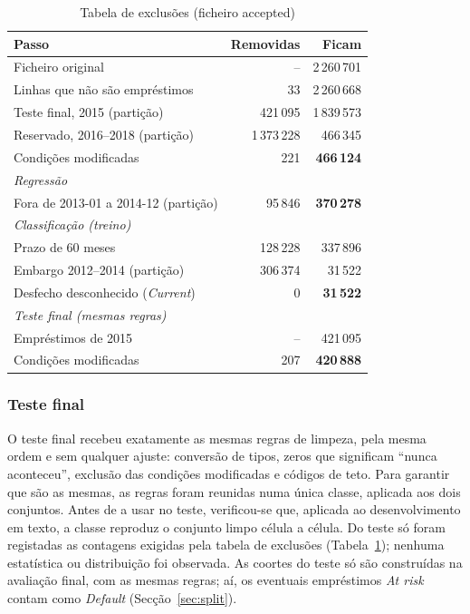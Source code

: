 \begin{table}[!t]
\caption{Tabela de exclusões (ficheiro accepted)}
\label{tab:exclusoes}
\centering
\footnotesize
\begin{tabular}{|p{}|r|r|}
\hline
\textbf{Passo} & \textbf{Removidas} & \textbf{Ficam} \\
\hline
Ficheiro original & -- & 2\,260\,701 \\
\hline
Linhas que não são empréstimos & 33 & 2\,260\,668 \\
\hline
Teste final, 2015 (partição) & 421\,095 & 1\,839\,573 \\
\hline
Reservado, 2016--2018 (partição) & 1\,373\,228 & 466\,345 \\
\hline
Condições modificadas & 221 & \textbf{466\,124} \\
\hline
\multicolumn{3}{|l|}{\textit{Regressão}} \\
\hline
Fora de 2013-01 a 2014-12 (partição) & 95\,846 & \textbf{370\,278} \\
\hline
\multicolumn{3}{|l|}{\textit{Classificação (treino)}} \\
\hline
Prazo de 60 meses & 128\,228 & 337\,896 \\
\hline
Embargo 2012--2014 (partição) & 306\,374 & 31\,522 \\
\hline
Desfecho desconhecido (\textit{Current}) & 0 & \textbf{31\,522} \\
\hline
\multicolumn{3}{|l|}{\textit{Teste final (mesmas regras)}} \\
\hline
Empréstimos de 2015 & -- & 421\,095 \\
\hline
Condições modificadas & 207 & \textbf{420\,888} \\
\hline
\end{tabular}
\end{table}

\subsubsection{Teste final}

O teste final recebeu exatamente as mesmas regras de limpeza, pela mesma ordem e sem
qualquer ajuste: conversão de tipos, zeros que significam ``nunca aconteceu'', exclusão
das condições modificadas e códigos de teto. Para garantir que são as mesmas, as regras
foram reunidas numa única classe, aplicada aos dois conjuntos. Antes de a usar no teste,
verificou-se que, aplicada ao desenvolvimento em texto, a classe reproduz o conjunto limpo
célula a célula. Do teste só foram registadas as contagens exigidas pela tabela de
exclusões (Tabela~\ref{tab:exclusoes}); nenhuma estatística ou distribuição foi observada.
As coortes do teste só são construídas na avaliação final, com as mesmas regras; aí, os
eventuais empréstimos \textit{At risk} contam como \textit{Default}
(Secção~\ref{sec:split}).

